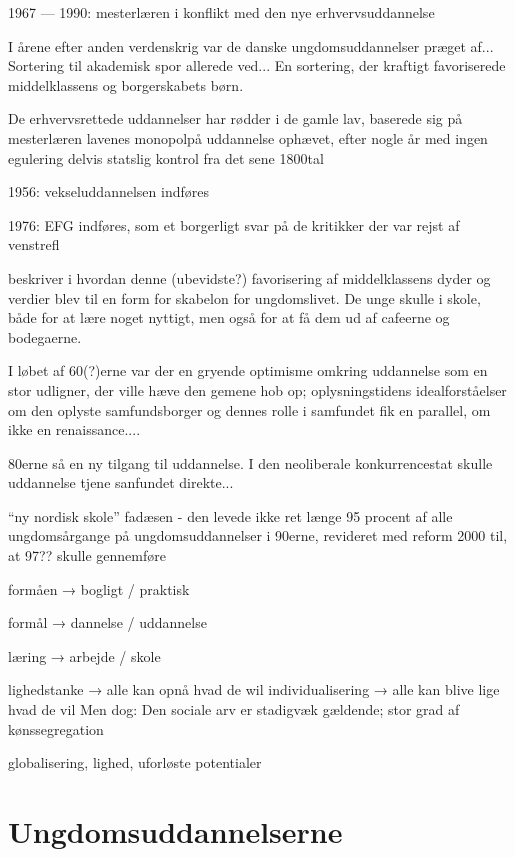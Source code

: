1967 — 1990: mesterlæren i konflikt med den nye erhvervsuddannelse


I årene efter anden verdenskrig var de danske ungdomsuddannelser præget af...
Sortering til akademisk spor allerede ved... En sortering, der kraftigt favoriserede middelklassens og borgerskabets børn.

De erhvervsrettede uddannelser har rødder i de gamle lav, baserede sig på mesterlæren 
lavenes monopolpå uddannelse ophævet, efter nogle år med ingen egulering delvis statslig kontrol fra det sene  1800tal

1956: vekseluddannelsen indføres

1976: EFG indføres, som et borgerligt svar på de kritikker der var rejst af venstrefl

\citeauthor{juulDiskurserOmUngdom2013} beskriver i  hvordan denne (ubevidste?) favorisering af middelklassens dyder og verdier blev
til en form for skabelon for ungdomslivet.
De unge skulle i skole, både for at lære noget nyttigt, men også for at få dem ud af cafeerne og bodegaerne.


I løbet af 60(?)erne var der en gryende optimisme omkring uddannelse som en stor udligner, der ville hæve den gemene hob op; oplysningstidens idealforståelser om den oplyste samfundsborger og dennes rolle i samfundet fik en parallel, om ikke en renaissance....

80erne så en ny tilgang til uddannelse.
I den neoliberale konkurrencestat skulle uddannelse tjene sanfundet direkte...


“ny nordisk skole” fadæsen - den levede ikke ret længe
95 procent af alle ungdomsårgange på ungdomsuddannelser i 90erne, revideret med reform 2000 til, at 97?? skulle gennemføre

formåen → bogligt / praktisk

formål → dannelse / uddannelse

læring → arbejde / skole

lighedstanke  → alle kan opnå hvad de wil
individualisering → alle kan blive lige hvad de vil
Men dog: Den sociale arv er stadigvæk gældende; stor grad af kønssegregation



globalisering, lighed, uforløste potentialer

\section{Ungdomsuddannelserne}

